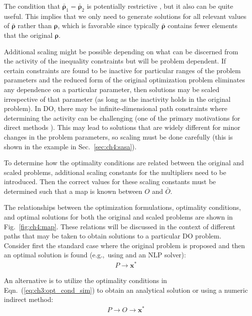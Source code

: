 \noindent The condition that $\bar{\bm{\rho}}_1 = \bar{\bm{\rho}}_2$ is potentially restrictive \cite{Kittirungsi2008a}, but it also can be quite useful.
This implies that we only need to generate solutions for all relevant values of $\bar{\bm{\rho}}$ rather than $\bm{\rho}$, which is favorable since typically $\bar{\bm{\rho}}$ contains fewer elements that the original $\bm{\rho}$.

Additional scaling might be possible depending on what can be discerned from the activity of the inequality constraints \cite{Papalambros2017a} but will be problem dependent.
If certain constraints are found to be inactive for particular ranges of the problem parameters and the reduced form of the original optimization problem eliminates any dependence on a particular parameter, then solutions may be scaled irrespective of that parameter (as long as the inactivity holds in the original problem).
In DO, there may be infinite-dimensional path constraints where determining the activity can be challenging (one of the primary motivations for direct methods \cite{Herber2017b}). This may lead to solutions that are widely different for minor changes in the problem parameters, so scaling must be done carefully (this is shown in the example in Sec.~\ref{sec:ch4:sasa}).

To determine how the optimality conditions are related between the original and scaled problems, additional scaling constants for the multipliers need to be introduced.
Then the correct values for these scaling constants must be determined such that a map is known between $O$ and $\bar{O}$.

The relationships between the optimization formulations, optimality conditions, and optimal solutions for both the original and scaled problems are shown in Fig.~\ref{fig:ch4:map}.
These relations will be discussed in the context of different paths that may be taken to obtain solutions to a particular DO problem.
Consider first the standard case where the original problem is proposed and then an optimal solution is found (e.g.,~using  and an NLP solver):
\begin{align*}
P \to \bm{x}^*
\end{align*}

\noindent An alternative is to utilize the optimality conditions in Eqn.~(\ref{eq:ch3:opt_cond_sim}) to obtain an analytical solution or using a numeric indirect method:
\begin{align*}
P \to O \to \bm{x}^*
\end{align*}

